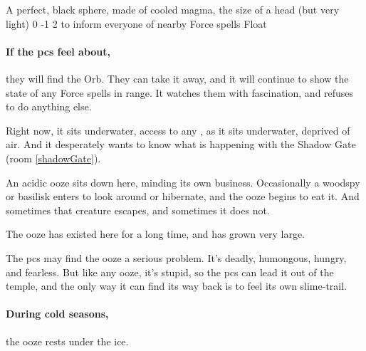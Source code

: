 \setcounter{wounds}{9}

  {A perfect, black sphere, made of cooled magma, the size of a head (but very light)}%
  {0}%
  {-1}%
  {2}%
  {to inform everyone of nearby Force spells}%
  {Float}%
  {
    \setcounter{Air}{3}
    \setcounter{Fire}{3}
    \setcounter{Earth}{1}
    \setcounter{Academics}{2}
    \setcounter{Xenomology}{2}
  }%

\setcounter{wounds}{0}

\showStdSpells[
  \setcounter{enc}{2}
  \findGatewaySpell
]

\paragraph{If the \glspl{pc} feel about,}
they will find the Orb.
They can take it away, and it will continue to show the state of any Force spells in range.
It watches them with fascination, and refuses to do anything else.

Right now, it sits underwater, access to any , as it sits underwater, deprived of air.
And it desperately wants to know what is happening with the Shadow Gate (room \vref{shadowGate}).


An acidic ooze sits down here, minding its own business.
Occasionally a woodspy or basilisk enters to look around or hibernate, and the ooze begins to eat it.
And sometimes that creature escapes, and sometimes it does not.

The ooze has existed here for a long time, and has grown very large.


The \glspl{pc} may find the ooze a serious problem.
It's deadly, humongous, hungry, and fearless.
But like any ooze, it's stupid, so the \glspl{pc} can lead it out of the temple, and the only way it can find its way back is to feel its own slime-trail.


\paragraph{During cold seasons,}
the ooze rests under the ice.

